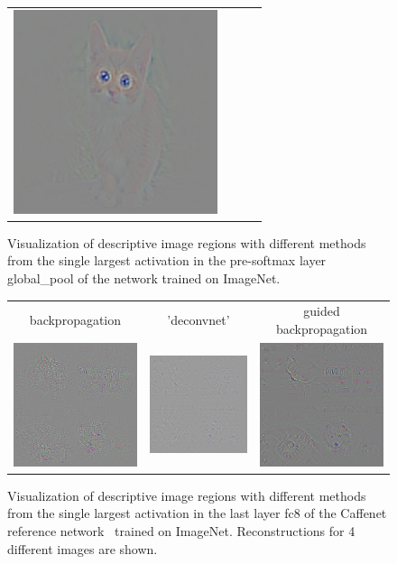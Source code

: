 \documentclass{article} %
\begin{document}
\begin{appendix}
\begin{figure}[h]
\begin{center}
\begin{tabular}{ >{\centering\arraybackslash} m{1.5cm} >{\centering\arraybackslash} m{3.5cm} >{\centering\arraybackslash} m{3.5cm} >{\centering\arraybackslash} m{3.5cm} }
  \includegraphics[width=.27\textwidth]{pool4_tobi_stride.png} 
\end{tabular}
\end{center}
\caption{Visualization of descriptive image regions with different methods from the single largest activation in the pre-softmax layer global\_pool of the network trained on ImageNet.}
\label{fig:pool4_different_methods}
\end{figure}

\begin{figure}[h]
\begin{center}
\begin{tabular}{c|c|c}
   backpropagation & 'deconvnet' & guided backpropagation \\
  \includegraphics[width=.31\textwidth]{caffenet_fc8_backprop.png} &
  \includegraphics[width=.31\textwidth]{caffenet_fc8_zeiler.png} &
  \includegraphics[width=.31\textwidth]{caffenet_fc8_tobi.png} 
\end{tabular}
\end{center}
\caption{Visualization of descriptive image regions with different methods from the single largest activation in the last layer fc8 of the Caffenet reference network~\citep{caffe} trained on ImageNet. Reconstructions for 4 different images are shown.}
\label{fig:fc8_caffenet}
\end{figure}



\end{appendix}
\end{document}
